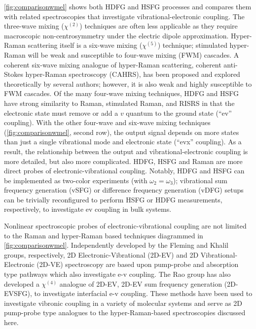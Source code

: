 \documentclass[aip, jcp, reprint, onecolumn, nofootinbib]{revtex4-2}
\begin{document}
\autoref{fig:comparisonwmel} shows both HDFG and HSFG processes and compares them with related spectroscopies that investigate vibrational-electronic coupling.
The three-wave mixing ($\chi^{(2)}$) techniques are often less applicable as they require macroscopic non-centrosymmetry under the electric dipole approximation.\cite{RN480}
Hyper-Raman scattering itself is a six-wave mixing ($\chi^{(5)}$) technique; stimulated hyper-Raman will be weak and susceptible to four-wave mixing (FWM) cascades.\cite{RN515, RN243, Cho2000_Cascade}
A coherent six-wave mixing analogue of hyper-Raman scattering, coherent anti-Stokes hyper-Raman spectroscopy (CAHRS), has been proposed and explored theoretically by several authors; however, it is also weak and highly susceptible to FWM cascades.\cite{Taran1977, Berger1978, Bjarnason1980, Cho1997, Cho1998}
Of the many four-wave mixing techniques, HDFG and HSFG have strong similarity to Raman, stimulated Raman, and RISRS in that the electronic state must remove or add a $v$ quantum to the ground state (``ev'' coupling).
With the other four-wave and six-wave mixing techniques (\autoref{fig:comparisonwmel}, second row), the output signal depends on more states than just a single vibrational mode and electronic state (``evx'' coupling).\cite{RN445, RN335} 
As a result, the relationship between the output and vibrational-electronic coupling is more detailed, but also more complicated.
HDFG, HSFG and Raman are more direct probes of electronic-vibrational coupling.
Notably, HDFG and HSFG can be implemented as two-color experiments (with $\omega_2=\omega_3$);\cite{Cho2001} vibrational sum frequency generation (vSFG) or difference frequency generation (vDFG) setups can be trivially reconfigured to perform HSFG or HDFG measurements, respectively, to investigate ev coupling in bulk systems.

Nonlinear spectroscopic probes of electronic-vibrational coupling are not limited to the Raman and hyper-Raman based techniques diagrammed in \autoref{fig:comparisonwmel}.
Independently developed by the Fleming and Khalil groups, respectively, 2D Electronic-Vibrational (2D-EV) and 2D Vibrational-Electronic (2D-VE) spectroscopy are based upon pump-probe and absorption type pathways which also investigate e-v coupling.\cite{Oliver2014, Courtney2015, Courtney2015_1}
The Rao group has also developed a $\chi^{(4)}$ analogue of 2D-EV, 2D-EV sum frequency generation (2D-EVSFG), to investigate interfacial e-v coupling. \cite{Deng2021}  
These methods have been used to investigate vibronic coupling in a variety of molecular systems and serve as 2D pump-probe type analogues to the hyper-Raman-based spectroscopies discussed here.\cite{Courtney2015, Gaynor2018, Arsenault2020, HuangFu2023}
\end{document}
